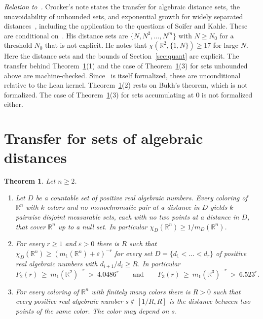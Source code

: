 \documentclass[11pt]{amsart}
\newtheorem{theorem}{Theorem}[section]
\theoremstyle{definition}
\newcommand{\R}{\mathbb{R}}
\begin{document}
\emph{Relation to~\cite{Crocker}.} Crocker's note states the transfer for algebraic distance sets, the unavoidability of unbounded sets, and exponential growth for widely separated distances~\cite[Corollaries 8.2, 8.3]{Crocker}, including the application to the questions of Soifer and Kahle. These are conditional on~\cite[Theorem 2.3]{OAI}. His distance sets are $\{N,N^2,\dots,N^m\}$ with $N\ge N_0$ for a threshold $N_0$ that is not explicit. He notes that $\chi(\R^2,\{1,N\})\ge17$ for large $N$. Here the distance sets and the bounds of Section~\ref{sec:quant} are explicit. The transfer behind Theorem~\ref{thm:E}(1) and the case of Theorem~\ref{thm:E}(3) for sets unbounded above are machine-checked. Since~\cite[Theorem 2.3]{OAI} is itself formalized, these are unconditional relative to the Lean kernel. Theorem~\ref{thm:E}(2) rests on Bukh's theorem, which is not formalized. The case of Theorem~\ref{thm:E}(3) for sets accumulating at $0$ is not formalized either.

\section{Transfer for sets of algebraic distances}\label{sec:multi}

\begin{theorem}\label{thm:E}
Let $n\ge2$.
\begin{enumerate}
\item Let $D$ be a countable set of positive real algebraic numbers. Every coloring of $\R^n$ with $k$ colors and no monochromatic pair at a distance in $D$ yields $k$ pairwise disjoint measurable sets, each with no two points at a distance in $D$, that cover $\R^n$ up to a null set. In particular $\chi_D(\R^n)\ge1/m_D(\R^n)$.
\item For every $r\ge1$ and $\varepsilon>0$ there is $R$ such that $\chi_D(\R^n)\ge(m_1(\R^n)+\varepsilon)^{-r}$ for every set $D=\{d_1<\dots<d_r\}$ of positive real algebraic numbers with $d_{i+1}/d_i\ge R$. In particular
\[
F_2(r)\ \ge\ m_1(\R^2)^{-r}\ >\ 4.0486^r\qquad\text{and}\qquad F_3(r)\ \ge\ m_1(\R^3)^{-r}\ >\ 6.523^r .
\]
\item For every coloring of $\R^n$ with finitely many colors there is $R>0$ such that every positive real algebraic number $s\notin[1/R,R]$ is the distance between two points of the same color. The color may depend on $s$.
\end{enumerate}
\end{theorem}
\end{document}
